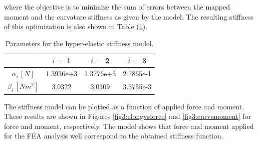 where the objective is to minimize the sum of errors between the mapped moment and the curvature stiffness as given by the model. The resulting stiffness of this optimization is also shown in Table (\ref{tab3:stiffnessparameters}). 

\begin{table}[H]
    \centering
        \caption{Parameters for the hyper-elastic stiffness model.}
\begin{tabular}{|c|c|c|c|} \hline
            &  $i = $ 1      &    $i = $    2   &  $i = $ 3  \\ \hline
   $\alpha_i \hspace{2pt}[N]$    &    1.3936e+3    & 1.3776e+3    & 2.7865e-1 \\ \hline
   $\beta_i \hspace{2pt}  [Nm^2] $     &  3.0322 & 3.0309    &  3.3755e-3\\ \hline
\end{tabular}
    \label{tab3:stiffnessparameters}
\end{table}

The stiffness model can be plotted as a function of applied force and moment. These results are shown in Figures \ref{fig3:elongvsforce} and \ref{fig3:curvsmoment} for force and moment, respectively. The model shows that force and moment applied for the FEA analysis well correspond to the obtained stiffness function. 


